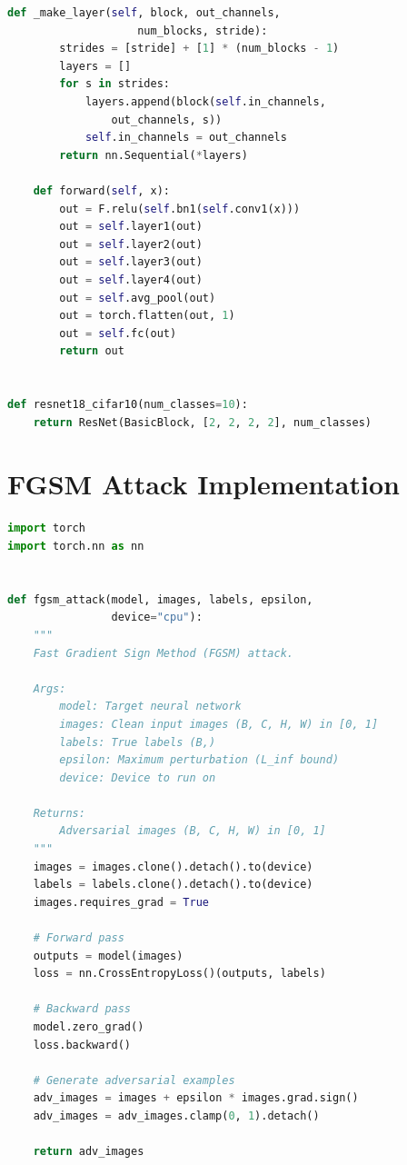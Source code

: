 \begin{lstlisting}[language=Python, caption={ResNet-18 Architecture for CIFAR-10}, label={lst:resnet}]
    def _make_layer(self, block, out_channels,
                    num_blocks, stride):
        strides = [stride] + [1] * (num_blocks - 1)
        layers = []
        for s in strides:
            layers.append(block(self.in_channels,
                out_channels, s))
            self.in_channels = out_channels
        return nn.Sequential(*layers)

    def forward(self, x):
        out = F.relu(self.bn1(self.conv1(x)))
        out = self.layer1(out)
        out = self.layer2(out)
        out = self.layer3(out)
        out = self.layer4(out)
        out = self.avg_pool(out)
        out = torch.flatten(out, 1)
        out = self.fc(out)
        return out


def resnet18_cifar10(num_classes=10):
    return ResNet(BasicBlock, [2, 2, 2, 2], num_classes)
\end{lstlisting}

\section{FGSM Attack Implementation}

\begin{lstlisting}[language=Python, caption={FGSM Attack Implementation}, label={lst:fgsm}]
import torch
import torch.nn as nn


def fgsm_attack(model, images, labels, epsilon,
                device="cpu"):
    """
    Fast Gradient Sign Method (FGSM) attack.

    Args:
        model: Target neural network
        images: Clean input images (B, C, H, W) in [0, 1]
        labels: True labels (B,)
        epsilon: Maximum perturbation (L_inf bound)
        device: Device to run on

    Returns:
        Adversarial images (B, C, H, W) in [0, 1]
    """
    images = images.clone().detach().to(device)
    labels = labels.clone().detach().to(device)
    images.requires_grad = True

    # Forward pass
    outputs = model(images)
    loss = nn.CrossEntropyLoss()(outputs, labels)

    # Backward pass
    model.zero_grad()
    loss.backward()

    # Generate adversarial examples
    adv_images = images + epsilon * images.grad.sign()
    adv_images = adv_images.clamp(0, 1).detach()

    return adv_images
\end{lstlisting}

